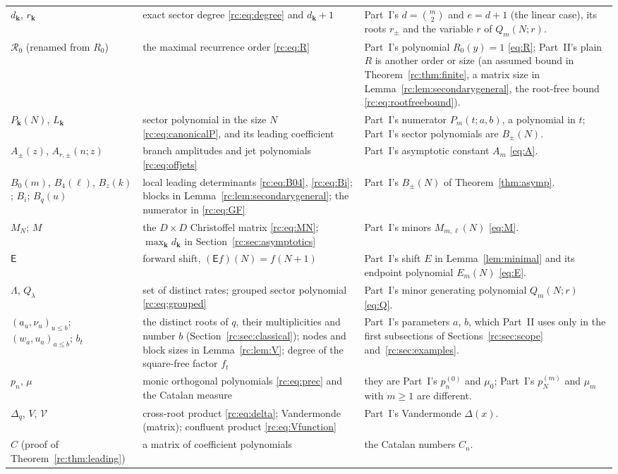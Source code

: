 \documentclass[11pt,a4paper]{article}
\numberwithin{equation}{section}
\theoremstyle{definition}
\theoremstyle{remark}
\newcommand{\bk}{\boldsymbol{k}}
\newcommand{\E}{\mathsf E}
\newcommand{\V}{\mathcal V}
\newcommand{\Rzero}{\mathcal R_0}
\begin{document}
\begin{longtable}{@{}>{\raggedright}p{}>{\raggedright}p{}>{\raggedright\arraybackslash}p{}@{}}
$d_{\bk}$, $r_{\bk}$
 & exact sector degree \eqref{rc:eq:degree} and $d_{\bk}+1$
 & Part~I's $d=\binom m2$ and $e=d+1$ (the linear case), its roots
   $r_\pm$ and the variable $r$ of $Q_m(N;r)$.\\
$\Rzero$ (renamed from $R_0$)
 & the maximal recurrence order \eqref{rc:eq:R}
 & Part~I's polynomial $R_0(y)=1$ \eqref{eq:R}; Part~II's plain $R$ is
   another order or size (an assumed bound in Theorem~\ref{rc:thm:finite},
   a matrix size in Lemma~\ref{rc:lem:secondarygeneral}, the root-free bound
   \eqref{rc:eq:rootfreebound}).\\
$P_{\bk}(N)$, $L_{\bk}$
 & sector polynomial in the size $N$ \eqref{rc:eq:canonicalP}, and its
   leading coefficient
 & Part~I's numerator $P_m(t;a,b)$, a polynomial in $t$; Part~I's sector
   polynomials are $B_\pm(N)$.\\
$A_\pm(z)$, $A_{r,\pm}(n;z)$
 & branch amplitudes and jet polynomials \eqref{rc:eq:offjets}
 & Part~I's asymptotic constant $A_m$ \eqref{eq:A}.\\
$B_0(m)$, $B_4(\ell)$, $B_z(k)$; $B_i$; $B_q(u)$
 & local leading determinants \eqref{rc:eq:B04}, \eqref{rc:eq:Bi}; blocks
   in Lemma~\ref{rc:lem:secondarygeneral}; the numerator in \eqref{rc:eq:GF}
 & Part~I's $B_\pm(N)$ of Theorem~\ref{thm:asymp}.\\
$M_N$; $M$
 & the $D\times D$ Christoffel matrix \eqref{rc:eq:MN}; $\max_{\bk}d_{\bk}$
   in Section~\ref{rc:sec:asymptotics}
 & Part~I's minors $M_{m,\ell}(N)$ \eqref{eq:M}.\\
$\E$ & forward shift, $(\E f)(N)=f(N+1)$
 & Part~I's shift $E$ in Lemma~\ref{lem:minimal} and its endpoint
   polynomial $E_m(N)$ \eqref{eq:E}.\\
$\Lambda$, $Q_\lambda$
 & set of distinct rates; grouped sector polynomial \eqref{rc:eq:grouped}
 & Part~I's minor generating polynomial $Q_m(N;r)$ \eqref{eq:Q}.\\
$(a_u,\nu_u)_{u\le b}$; $(w_a,u_a)_{a\le b}$; $b_t$
 & the distinct roots of $q$, their multiplicities and number $b$
   (Section~\ref{rc:sec:classical}); nodes and block sizes in
   Lemma~\ref{rc:lem:V}; degree of the square-free factor $f_t$
 & Part~I's parameters $a$, $b$, which Part~II uses only in the first
   subsections of Sections~\ref{rc:sec:scope} and~\ref{rc:sec:examples}.\\
$p_n$, $\mu$
 & monic orthogonal polynomials \eqref{rc:eq:prec} and the Catalan measure
 & they are Part~I's $p_n^{(0)}$ and $\mu_0$; Part~I's $p_N^{(m)}$ and
   $\mu_m$ with $m\ge1$ are different.\\
$\Delta_q$, $V$, $\V$
 & cross-root product \eqref{rc:eq:delta}; Vandermonde (matrix);
   confluent product \eqref{rc:eq:Vfunction}
 & Part~I's Vandermonde $\Delta(x)$.\\
$C$ (proof of Theorem~\ref{rc:thm:leading})
 & a matrix of coefficient polynomials
 & the Catalan numbers $C_n$.\\
\end{longtable}
\endgroup
\end{document}
